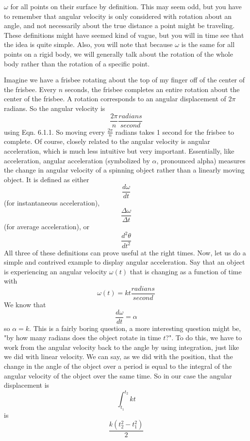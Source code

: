 $\omega$ for all points on their surface by definition. This may seem odd, but you have to remember that angular velocity is only considered with rotation about an angle, and not necessarily about the true distance a point might be traveling. These definitions might have seemed kind of vague, but you will in time see that the idea is quite simple. Also, you will note that because $\omega$ is the same for all points on a rigid body, we will generally talk about the rotation of the whole body rather than the rotation of a specific point. 

Imagine we have a frisbee rotating about the top of my finger off of the center of the frisbee. Every $n$ seconds, the frisbee completes an entire rotation about the center of the frisbee. A rotation corresponds to an angular displacement of $2\pi$ radians. So the angular velocity is $$\frac{2\pi}{n} \frac{radians}{second}$$ using Eqn. 6.1.1. So moving every $\frac{2\pi}{n}$ radians takes 1 second for the frisbee to complete. Of course, closely related to the angular velocity is angular acceleration, which is much less intuitive but very important. Essentially, like acceleration, angular acceleration (symbolized by $\alpha$, pronounced alpha)  measures the change in angular velocity of a spinning object rather than a linearly moving object. It is defined as either $$\frac{d\omega}{dt}$$(for instantaneous acceleration), $$\frac{\Delta \omega}{\Delta t}$$(for average acceleration), or $$\frac{d^2\theta}{dt^2}$$ All three of these definitions can prove useful at the right times. Now, let us do a simple and contrived example to display angular acceleration. Say that an object is experiencing an angular velocity $\omega \left(t\right)$ that is changing as a function of time with $$\omega \left(t\right)=kt \frac{radians}{second}$$ We know that \begin{equation}\frac{d \omega}{dt}=\alpha\end{equation} so $\alpha=k$. This is a fairly boring question, a more interesting question might be, "by how many radians does the object rotate in time $t$?". To do this, we have to work from the angular velocity back to the angle by using integration, just like we did with linear velocity. We can say, as we did with the position, that the change in the angle of the object over a period is equal to the integral of the angular velocity of the object over the same time. So in our case the angular displacement is $$\int_{t_1}^{t_2} kt$$ is $$\frac{k\left(t_{2}^2-t_{1}^2\right)}{2}$$